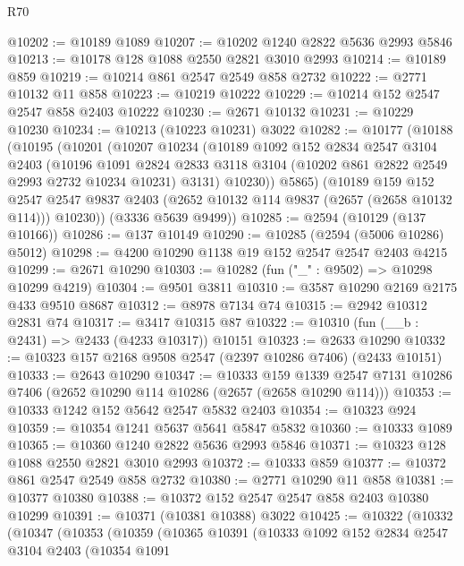 \begin{lexlean}{R70}
\begin{coremodule}
@10202 := @10189 @1089
@10207 := @10202 @1240 @2822 @5636 @2993 @5846
@10213 := @10178 @128 @1088 @2550 @2821 @3010 @2993
@10214 := @10189 @859
@10219 := @10214 @861 @2547 @2549 @858 @2732
@10222 := @2771 @10132 @11 @858
@10223 := @10219 @10222
@10229 := @10214 @152 @2547 @2547 @858 @2403 @10222
@10230 := @2671 @10132
@10231 := @10229 @10230
@10234 := @10213 (@10223 @10231) @3022
@10282 := @10177
    (@10188
      (@10195
        (@10201
          (@10207
            @10234
            (@10189
              @1092
              @152
              @2834
              @2547
              @3104
              @2403
              (@10196
                @1091
                @2824
                @2833
                @3118
                @3104
                (@10202 @861 @2822 @2549 @2993 @2732 @10234 @10231)
                @3131)
              @10230))
          @5865)
        (@10189
          @159
          @152
          @2547
          @2547
          @9837
          @2403
          (@2652 @10132 @114 @9837 (@2657 (@2658 @10132 @114)))
          @10230))
      (@3336 @5639 @9499))
@10285 := @2594 (@10129 (@137 @10166))
@10286 := @137 @10149
@10290 := @10285 (@2594 (@5006 @10286) @5012)
@10298 := @4200 @10290 @1138 @19 @152 @2547 @2547 @2403 @4215
@10299 := @2671 @10290
@10303 := @10282 (fun ("_" : @9502) => @10298 @10299 @4219)
@10304 := @9501 @3811
@10310 := @3587 @10290 @2169 @2175 @433 @9510 @8687
@10312 := @8978 @7134 @74
@10315 := @2942 @10312 @2831 @74
@10317 := @3417 @10315 @87
@10322 := @10310 (fun (__b : @2431) => @2433 (@4233 @10317)) @10151
@10323 := @2633 @10290
@10332 := @10323 @157 @2168 @9508 @2547 (@2397 @10286 @7406) (@2433 @10151)
@10333 := @2643 @10290
@10347 := @10333
    @159
    @1339
    @2547
    @7131
    @10286
    @7406
    (@2652 @10290 @114 @10286 (@2657 (@2658 @10290 @114)))
@10353 := @10333 @1242 @152 @5642 @2547 @5832 @2403
@10354 := @10323 @924
@10359 := @10354 @1241 @5637 @5641 @5847 @5832
@10360 := @10333 @1089
@10365 := @10360 @1240 @2822 @5636 @2993 @5846
@10371 := @10323 @128 @1088 @2550 @2821 @3010 @2993
@10372 := @10333 @859
@10377 := @10372 @861 @2547 @2549 @858 @2732
@10380 := @2771 @10290 @11 @858
@10381 := @10377 @10380
@10388 := @10372 @152 @2547 @2547 @858 @2403 @10380 @10299
@10391 := @10371 (@10381 @10388) @3022
@10425 := @10322
    (@10332
      (@10347
        (@10353
          (@10359
            (@10365
              @10391
              (@10333
                @1092
                @152
                @2834
                @2547
                @3104
                @2403
                (@10354
                  @1091

\end{coremodule}
\end{lexlean}
